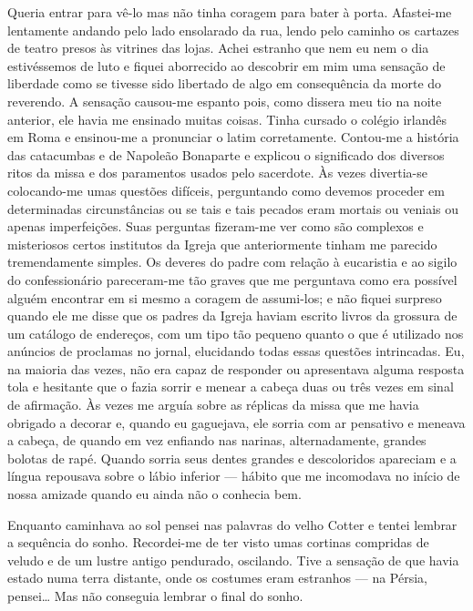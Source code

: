 Queria entrar para vê-lo mas não tinha coragem para bater à porta.
Afastei-me lentamente andando pelo lado ensolarado da rua, lendo pelo
caminho os cartazes de teatro presos às vitrines das lojas. Achei
estranho que nem eu nem o dia estivéssemos de luto e fiquei aborrecido
ao descobrir em mim uma sensação de liberdade como se tivesse sido
libertado de algo em consequência
da morte do reverendo. A sensação causou-me espanto pois, como dissera
meu tio na noite anterior, ele havia me ensinado muitas coisas. Tinha
cursado o colégio irlandês em Roma e ensinou-me a pronunciar o latim
corretamente. Contou-me a história das catacumbas e de Napoleão
Bonaparte e explicou o significado dos diversos ritos da missa e dos
paramentos usados pelo sacerdote. Às vezes divertia-se colocando-me
umas questões difíceis, perguntando como devemos proceder em
determinadas circunstâncias ou se tais e tais pecados eram mortais
ou veniais ou apenas imperfeições. Suas perguntas fizeram-me ver como
são complexos e misteriosos certos institutos da Igreja que
anteriormente tinham me parecido tremendamente simples. Os deveres do
padre com relação à eucaristia e ao sigilo do confessionário
pareceram-me tão graves que me perguntava como era possível alguém
encontrar em si mesmo a coragem de assumi-los; e não fiquei surpreso
quando ele me disse que os padres da Igreja haviam escrito livros da
grossura de um catálogo de endereços, com um tipo tão pequeno quanto o
que é utilizado nos anúncios de proclamas no jornal, elucidando
todas essas questões intrincadas. Eu, na maioria das vezes, não era
capaz de responder ou apresentava alguma resposta tola e hesitante que
o fazia sorrir e menear a cabeça duas ou três vezes em sinal de
afirmação. Às vezes me arguía sobre as réplicas da missa que me havia
obrigado a decorar e, quando eu gaguejava, ele sorria com ar pensativo
e meneava a cabeça, de quando em vez enfiando nas narinas,
alternadamente, grandes bolotas de rapé. Quando sorria seus dentes
grandes e descoloridos apareciam e a língua repousava sobre o lábio
inferior --- hábito que me incomodava no início de nossa amizade quando eu ainda
não o conhecia bem.

Enquanto caminhava ao sol pensei nas palavras do velho Cotter e tentei
lembrar a sequência do sonho. Recordei-me de ter visto umas cortinas
compridas de veludo e de um lustre antigo pendurado, oscilando. Tive a
sensação de que havia estado numa terra distante, onde os costumes eram
estranhos --- na Pérsia, pensei\ldots{} Mas não conseguia lembrar o final
do sonho.

